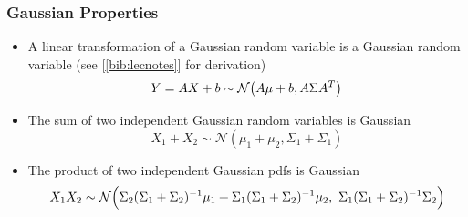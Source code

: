 \documentclass[twoside]{article}
\begin{document}
\subsubsection{Gaussian Properties}\label{sec:gaussProperties}
\begin{itemize}
    \item A linear transformation of a Gaussian random variable is a Gaussian random variable (see [\ref{bib:lecnotes}] for derivation)\\
    \begin{equation}
         Y = AX + b \sim \mathcal{N}\big{(}A\mu+b,  A\Sigma A^T\big{)}
    \end{equation}
    
    \item The sum of two independent Gaussian random variables is Gaussian
    \begin{equation}
        X_1 + X_2 \sim \mathcal{N}(\mu_1 + \mu_2, \Sigma_1 + \Sigma_1)
    \end{equation}
    
    \item The product of two independent Gaussian pdfs is Gaussian
    \begin{equation}
        X_1X_2 \sim \mathcal{N}\Big{(}\Sigma_2(\Sigma_1+\Sigma_2)^{-1}\mu_1 + \Sigma_1(\Sigma_1+\Sigma_2)^{-1}\mu_2,\ \Sigma_1(\Sigma_1+\Sigma_2)^{-1}\Sigma_2 \Big{)}
    \end{equation}
    
\end{itemize}
\end{document}
